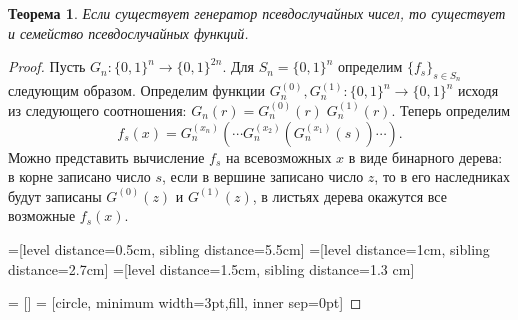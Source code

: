 \documentclass[12pt]{article}
\newcommand{\bits}{\{0,1\}}
\theoremstyle{definition}
\theoremstyle{plain}
\newtheorem{theorem}{Теорема}[section]
\theoremstyle{remark}
\begin{document}
\begin{theorem}
Если существует генератор псевдослучайных чисел, то существует и семейство псевдослучайных функций.
\end{theorem}
\begin{proof}
Пусть $G_n:\bits^n\to\bits^{2n}$. Для $S_n = \bits^n$  определим $\{f_s\}_{s\in S_n}$ следующим образом.
Определим функции $G_n^{(0)},G_n^{(1)}: \bits^n\to\bits^n$ исходя из следующего соотношения:  
$G_n(r) = G_n^{(0)}(r)\; G_n^{(1)}(r)$. Теперь определим 
$$f_s(x) = G_n^{(x_n)}(\dotsb G_n^{(x_2)}(G_n^{(x_1)}(s))  \dotsb).$$
Можно представить вычисление $f_s$ на всевозможных $x$ в виде бинарного дерева: 
в корне записано число $s$, если в вершине записано число $z$, то в его наследниках будут записаны $G^{(0)}(z)$ 
и $G^{(1)}(z)$, в листьях дерева окажутся все возможные $f_s(x)$.

=[level distance=0.5cm, sibling distance=5.5cm]
=[level distance=1cm, sibling distance=2.7cm]
=[level distance=1.5cm, sibling distance=1.3 cm]

 = []
 = [circle, minimum width=3pt,fill, inner sep=0pt]


\end{proof}
\end{document}

